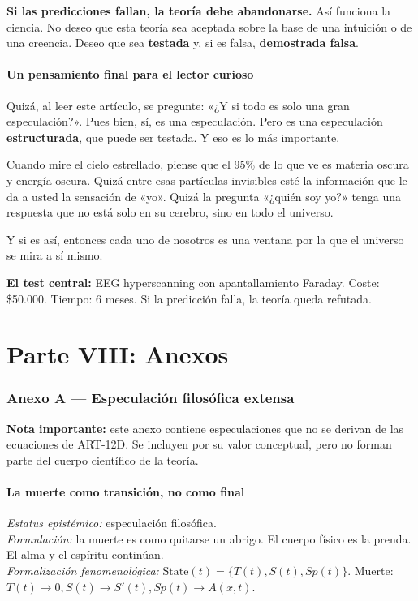 \documentclass[11pt,a4paper]{article}
\begin{document}
\textbf{Si las predicciones fallan, la teoría debe abandonarse.} Así funciona la ciencia. No deseo que esta teoría sea aceptada sobre la base de una intuición o de una creencia. Deseo que sea \textbf{testada} y, si es falsa, \textbf{demostrada falsa}.

\subsection{Un pensamiento final para el lector curioso}
Quizá, al leer este artículo, se pregunte: «¿Y si todo es solo una gran especulación?». Pues bien, sí, es una especulación. Pero es una especulación \textbf{estructurada}, que puede ser testada. Y eso es lo más importante.

Cuando mire el cielo estrellado, piense que el 95\% de lo que ve es materia oscura y energía oscura. Quizá entre esas partículas invisibles esté la información que le da a usted la sensación de «yo». Quizá la pregunta «¿quién soy yo?» tenga una respuesta que no está solo en su cerebro, sino en todo el universo.

Y si es así, entonces cada uno de nosotros es una ventana por la que el universo se mira a sí mismo.

\textbf{El test central:} EEG hyperscanning con apantallamiento Faraday. Coste: \$50.000. Tiempo: 6 meses. Si la predicción falla, la teoría queda refutada.

\newpage
\part*{Parte VIII: Anexos}

\section{Anexo A --- Especulación filosófica extensa}
\textbf{Nota importante:} este anexo contiene especulaciones que no se derivan de las ecuaciones de ART-12D. Se incluyen por su valor conceptual, pero no forman parte del cuerpo científico de la teoría.

\subsection{La muerte como transición, no como final}
\textit{Estatus epistémico:} especulación filosófica. \\
\textit{Formulación:} la muerte es como quitarse un abrigo. El cuerpo físico es la prenda. El alma y el espíritu continúan. \\
\textit{Formalización fenomenológica:} $\text{State}(t) = \{ T(t), S(t), Sp(t) \}$. Muerte: $T(t) \to 0, S(t) \to S'(t), Sp(t) \to A(x,t)$.
\end{document}
